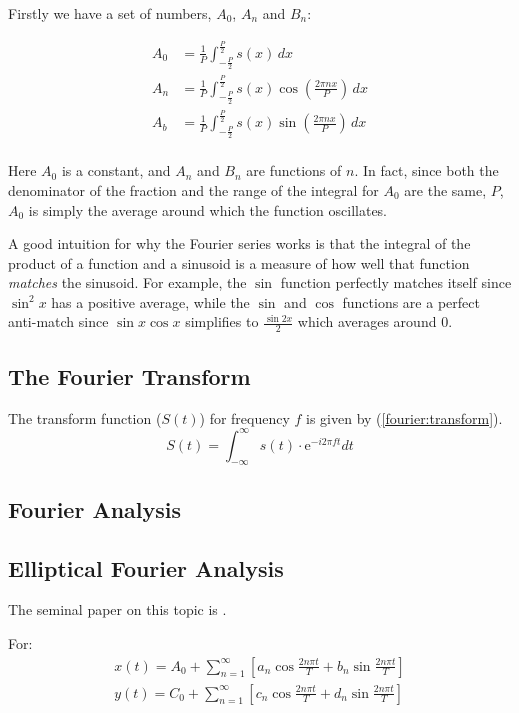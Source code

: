 \documentclass[12pt,english]{article}
\begin{document}
Firstly we have a set of numbers, \(A_0\), \(A_n\) and \(B_n\):

\begin{equation}
\begin{aligned}
	A_0 &= \frac{1}{P} \int_{-\frac{P}{2}}^{\frac{P}{2}}
		s(x) \,dx \\
	A_n &= \frac{1}{P} \int_{-\frac{P}{2}}^{\frac{P}{2}}
		s(x) \cos \left(\frac{2\pi nx}{P}\right) \,dx \\
	A_b &= \frac{1}{P} \int_{-\frac{P}{2}}^{\frac{P}{2}}
		s(x) \sin \left(\frac{2\pi nx}{P}\right) \,dx \\
\end{aligned}
\end{equation}

Here \(A_0\) is a constant, and \(A_n\) and \(B_n\) are functions of \(n\).
In fact, since both the denominator of the fraction and the range of the integral for \(A_0\) are the same, \(P\),
\(A_0\) is simply the average around which the function oscillates.

A good intuition for why the Fourier series works is that the
integral of the product of a function and a sinusoid is a measure
of how well that function \textit{matches} the sinusoid.
For example, the $\sin$ function perfectly matches itself since 
$\sin^2x$ has a positive average, while the $\sin$ and $\cos$
functions are a perfect anti-match since $\sin x \cos x$ simplifies
to $\frac{\sin 2x}{2}$ which averages around $0$.

\subsection{The Fourier Transform}
The transform function ($S(t)$) for frequency $f$ is given by
(\ref{fourier:transform}).
\begin{equation} \label{fourier:transform}
	S(t)=\int_{-\infty}^{\infty}s(t)\cdot \mathrm{e}^{-i2\pi ft} dt
\end{equation}

\subsection{Fourier Analysis}

\subsection{Elliptical Fourier Analysis}
The seminal paper on this topic is \cite{kuhl:1982}.

For:
\begin{equation}
\begin{aligned}
	x(t) = A_0+\sum_{n=1}^{\infty}\left[a_n\cos\frac{2n\pi t}{T}+b_n\sin\frac{2n\pi t}{T}\right] \\
	y(t) = C_0+\sum_{n=1}^{\infty}\left[c_n\cos\frac{2n\pi t}{T}+d_n\sin\frac{2n\pi t}{T}\right]
\end{aligned}
\end{equation}
\end{document}
